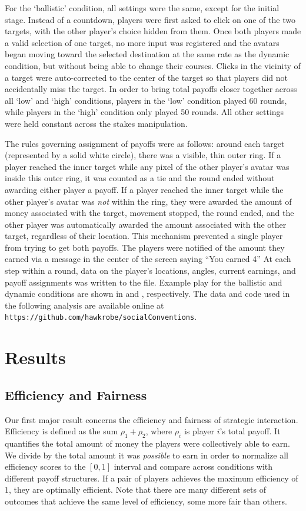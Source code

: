 \documentclass[10pt,letterpaper]{article}
\begin{document}
For the `ballistic' condition, all settings were the same, except for the initial stage. Instead of a countdown, players were first asked to click on one of the two targets, with the other player's choice hidden from them. Once both players made a valid selection of one target, no more input was registered and the avatars began moving toward the selected destination at the same rate as the dynamic condition, but without being able to change their courses. Clicks in the vicinity of a target were auto-corrected to the center of the target so that players did not accidentally miss the target. In order to bring total payoffs closer together across all `low' and `high' conditions, players in the `low' condition played 60 rounds, while players in the `high' condition only played 50 rounds. All other settings were held constant across the stakes manipulation. 

The rules governing assignment of payoffs were as follows: around each target (represented by a solid white circle), there was a visible, thin outer ring. If a player reached the inner target while any pixel of the other player's avatar was inside this outer ring, it was counted as a tie and the round ended without awarding either player a payoff. If a player reached the inner target while the other player's avatar was \emph{not} within the ring, they were awarded the amount of money associated with the target, movement stopped, the round ended, and the other player was automatically awarded the amount associated with the other target, regardless of their location. This mechanism prevented a single player from trying to get both payoffs. The players were notified of the amount they earned via a message in the center of the screen saying ``You earned 4\textcent [2\textcent]'' At each step within a round, data on the player's locations, angles, current earnings, and payoff assignments was written to the file. Example play for the ballistic and dynamic conditions are shown in  and , respectively. The data and code used in the following analysis are available online at \texttt{https://github.com/hawkrobe/socialConventions}.

\section*{Results}

\subsection*{Efficiency and Fairness} Our first major result concerns the efficiency and fairness of strategic interaction. Efficiency is defined as the sum $\rho_1 + \rho_2$, where $\rho_i$ is player $i$'s total payoff. It quantifies the total amount of money the players were collectively able to earn. We divide by the total amount it was \emph{possible} to earn in order to normalize all efficiency scores to the $[0,1]$ interval and compare across conditions with different payoff structures. If a pair of players achieves the maximum efficiency of $1$, they are optimally efficient. Note that there are many different sets of outcomes that achieve the same level of efficiency, some more fair than others.
\end{document}
